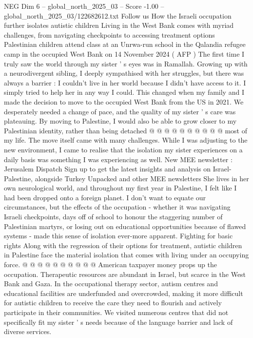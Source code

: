 \begin{textsample}{NEG Dim 6 – global\_north\_2025\_03 – Score -1.00 – global\_north\_2025\_03/122682612.txt}  \label{ex:f6_neg_167}
Follow us How the Israeli occupation further isolates autistic children Living in the West Bank comes with myriad challenges, from navigating checkpoints to accessing treatment options Palestinian children attend class at an Unrwa-run school in the Qalandia refugee camp in the occupied West Bank on 14 November 2024 ( AFP ) The first time I truly saw the world through my sister ' s eyes was in Ramallah.
Growing up with a neurodivergent sibling, I deeply sympathised with her struggles, but there was always a barrier : I couldn't live in her world because I didn't have access to it.
I simply tried to help her in any way I could.
This changed when my family and I made the decision to move to the occupied West Bank from the US in 2021.
We desperately needed a change of pace, and the quality of my sister ' s care was plateauing.
By moving to Palestine, I would also be able to grow closer to my Palestinian identity, rather than being detached @ @ @ @ @ @ @ @ @ @ most of my life.
The move itself came with many challenges.
While I was adjusting to the new environment, I came to realise that the isolation my sister experiences on a daily basis was something I was experiencing as well.
New MEE newsletter : Jerusalem Dispatch Sign up to get the latest insights and analysis on Israel-Palestine, alongside Turkey Unpacked and other MEE newsletters She lives in her own neurological world, and throughout my first year in Palestine, I felt like I had been dropped onto a foreign planet.
I don't want to equate our circumstances, but the effects of the occupation - whether it was navigating Israeli checkpoints, days off of school to honour the staggering number of Palestinian martyrs, or losing out on educational opportunities because of flawed systems - made this sense of isolation ever-more apparent.
Fighting for basic rights Along with the regression of their options for treatment, autistic children in Palestine face the material isolation that comes with living under an occupying force. @ @ @ @ @ @ @ @ @ @ American taxpayer money props up the occupation.
Therapeutic resources are abundant in Israel, but scarce in the West Bank and Gaza.
In the occupational therapy sector, autism centres and educational facilities are underfunded and overcrowded, making it more difficult for autistic children to receive the care they need to flourish and actively participate in their communities.
We visited numerous centres that did not specifically fit my sister ' s needs because of the language barrier and lack of diverse services.

\end{textsample}
